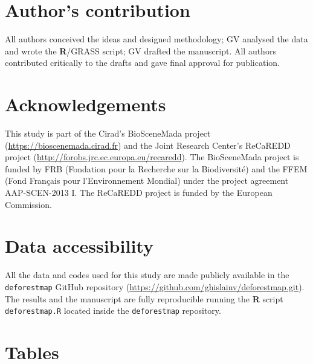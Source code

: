 \documentclass[a4paper, 12pt, leqno]{article} %
\newcommand{\R}{\textnormal{\sffamily\bfseries R}}
\begin{document}
\newpage

\section{Author's contribution}
\label{authors-contribution}

All authors conceived the ideas and designed methodology; GV analysed
the data and wrote the {\R}/GRASS script; GV drafted the manuscript. All
authors contributed critically to the drafts and gave final approval for
publication.

\section{Acknowledgements}
\label{acknowledgements}

This study is part of the Cirad's BioSceneMada project
(\url{https://bioscenemada.cirad.fr}) and the Joint Research Center's
ReCaREDD project (\url{http://forobs.jrc.ec.europa.eu/recaredd}). The
BioSceneMada project is funded by FRB (Fondation pour la Recherche sur
la Biodiversité) and the FFEM (Fond Français pour l'Environnement
Mondial) under the project agreement AAP-SCEN-2013 I. The ReCaREDD
project is funded by the European Commission.

\section{Data accessibility}
\label{data-accessibility}

All the data and codes used for this study are made publicly available
in the \texttt{deforestmap} GitHub repository
(\url{https://github.com/ghislainv/deforestmap.git}). The results and
the manuscript are fully reproducible running the {\R} script
\texttt{deforestmap.R} located inside the \texttt{deforestmap}
repository.

\newpage
\singlespacing




\newpage

\section{Tables}
\label{tables}

\nopagebreak
\end{document}
